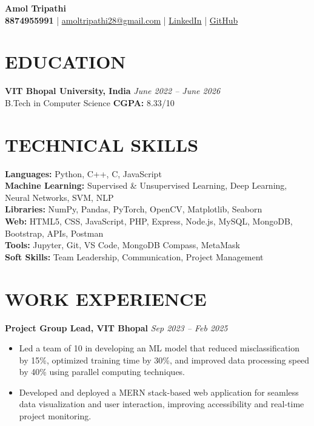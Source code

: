 \documentclass[a4paper,10pt]{article}
\begin{document}
\begin{center}
    \textbf{\Huge Amol Tripathi} \\
    \vspace{0.2em}
    \textbf{8874955991} \quad | \quad 
    \href{mailto:amoltripathi28@gmail.com}{amoltripathi28@gmail.com} \quad | \quad
    \href{https://www.linkedin.com/in/amol-tri12/}{LinkedIn} \quad | \quad \href{https://github.com/amoltrip28}{GitHub}
\end{center}

\section*{EDUCATION}
\textbf{VIT Bhopal University, India} \hfill \textit{June 2022 – June 2026} \\
B.Tech in Computer Science \hfill \textbf{CGPA:} 8.33/10

\section*{TECHNICAL SKILLS}
\textbf{Languages:} Python, C++, C, JavaScript \\
\textbf{Machine Learning:} Supervised & Unsupervised Learning, Deep Learning, Neural Networks, SVM, NLP \\
\textbf{Libraries:} NumPy, Pandas, PyTorch, OpenCV, Matplotlib, Seaborn \\
\textbf{Web:} HTML5, CSS, JavaScript, PHP, Express, Node.js, MySQL, MongoDB, Bootstrap, APIs, Postman \\
\textbf{Tools:} Jupyter, Git, VS Code, MongoDB Compass, MetaMask \\
\textbf{Soft Skills:} Team Leadership, Communication, Project Management

\section*{WORK EXPERIENCE}

\textbf{Project Group Lead, VIT Bhopal} \hfill \textit{Sep 2023 – Feb 2025} \\
\begin{itemize}[leftmargin=1em]
    \item Led a team of 10 in developing an ML model that reduced misclassification by 15\%, optimized training time by 30\%, and improved data processing speed by 40\% using parallel computing techniques.
    \item Developed and deployed a MERN stack-based web application for seamless data visualization and user interaction, improving accessibility and real-time project monitoring.
\end{itemize}
\end{document}

